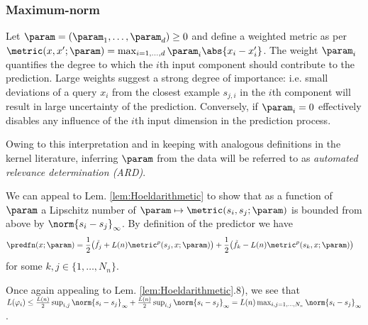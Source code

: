  \subsubsection{Maximum-norm}
 Let $\param =  (\param_1,\ldots,\param_d) \geq 0$ and define a weighted metric as per $\metric(x,x';\param) = \max_{i=1,\ldots,d} \param_i \abs{x_i-x_i'}$. The weight $\param_i$ quantifies the degree to which the $i$th input component should contribute to the prediction. Large weights suggest a strong degree of importance: i.e. small deviations of a query $x_i$ from the closest example $s_{j,i}$ in the $i$th component will result in large uncertainty of the prediction. Conversely, if $\param_i=0$ effectively disables any influence of the $i$th input dimension in the prediction process.
 
Owing to this interpretation and in keeping with analogous definitions in the kernel literature, inferring $\param$ from the data will be referred to as \emph{automated relevance determination (ARD)}. 

We can appeal to Lem. \ref{lem:Hoeldarithmetic} to show that as a function of $\param$ a Lipschitz number of $\param \mapsto \metric(s_i,s_j;\param)$ is bounded from above by 
$\norm{s_i-s_j}_\infty$. By definition of the predictor we have \begin{align}
\predfn(x;\param) &= \frac 1 2 \bigl( \tilde f_j + L(n) \metric^p(s_j,x;\param)   \bigr) + \frac 1 2 \bigl( \tilde  f_k - L(n) \metric^p(s_k,x;\param) \bigr)
\end{align}
for some $k,j \in\{1,\ldots,N_n\}$.

Once again appealing to Lem. \ref{lem:Hoeldarithmetic}.8), we see that 
$L(\varphi_i) \leq \frac {L(n)} 2 \sup_{i,j} \norm{s_i-s_j} _\infty+ \frac {L(n)} 2 \sup_{i,j} \norm{s_i-s_j}_\infty = {L(n)} \max_{i,j=1,...,N_n} \norm{s_i-s_j}_\infty$.

